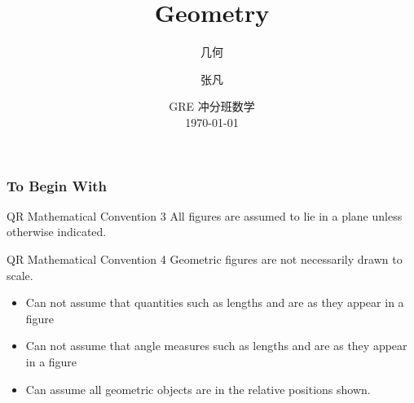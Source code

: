 \documentclass[
	11pt, %
]{beamer}
\title[Geometry]{Geometry} %
\subtitle{几何} %
\author[张凡]{张凡} %
\institute[XDF]{新东方国际教育 \\ \smallskip \textit{zhangfan@xdf.cn}} %
\date[\today]{GRE 冲分班数学 \\ \today} %
\begin{document}

\begin{frame}
	\titlepage %
\end{frame}



\begin{frame}
	\frametitle{To Begin With} %

	\begin{block}{QR Mathematical Convention 3}
		All figures are assumed to lie in a plane unless otherwise indicated.
	\end{block}

		\begin{block}{QR Mathematical Convention 4}
		Geometric figures are not necessarily drawn to scale.
	\end{block}
	\begin{example}
		\begin{itemize}
			\item \alert{Can not} assume  that quantities such as lengths and  are as they appear in a figure
			\item \alert{Can not} assume  that angle measures such as lengths and  are as they appear in a figure 
			\item \alert{Can} assume all geometric objects are in the relative positions shown.
		\end{itemize}
	\end{example}
\end{frame}

\end{document}
